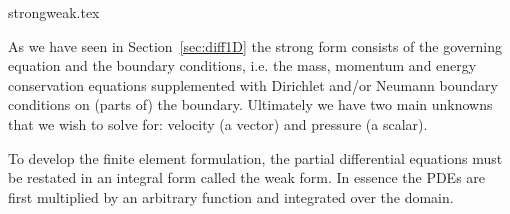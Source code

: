 \begin{flushright} {\tiny {\color{gray} strongweak.tex}} \end{flushright}


As we have seen in Section~\ref{sec:diff1D}
the strong form consists of the governing equation and the boundary conditions, i.e. 
the mass, momentum and energy conservation equations supplemented with Dirichlet and/or Neumann
boundary conditions on (parts of) the boundary. Ultimately we have two main unknowns that 
we wish to solve for: velocity (a vector) and pressure (a scalar).

To develop the finite element formulation, the partial differential equations 
must be restated in an integral form called the weak form. In essence the PDEs are 
first multiplied by an arbitrary function and integrated over the domain.

